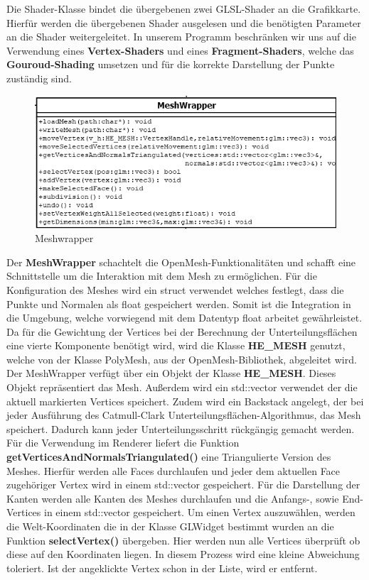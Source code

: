 \noindent Die Shader-Klasse bindet die übergebenen zwei GLSL-Shader an die Grafikkarte. Hierfür werden die übergebenen Shader ausgelesen und die benötigten Parameter an die Shader weitergeleitet. In unserem Programm beschränken wir uns auf die Verwendung eines \textbf{Vertex-Shaders} und eines \textbf{Fragment-Shaders}, welche das \textbf{Gouroud-Shading} umsetzen und für die korrekte Darstellung der Punkte zuständig sind.

	\begin{figure}[H]
	\centering
	\includegraphics[width=0.7\linewidth]{meshWrapper.png}
	\caption{Meshwrapper}
	\label{fig7}
	\end{figure}

\noindent Der \textbf{MeshWrapper} schachtelt die OpenMesh-Funktionalitäten und schafft eine Schnittstelle um die Interaktion mit dem Mesh zu ermöglichen. Für die Konfiguration des Meshes wird ein struct verwendet welches festlegt, dass die Punkte und Normalen als float gespeichert werden. Somit ist die Integration in die Umgebung, welche vorwiegend mit dem Datentyp float arbeitet gewährleistet. Da für die Gewichtung der Vertices bei der Berechnung der Unterteilungsflächen eine vierte Komponente benötigt wird, wird die Klasse \textbf{HE\_MESH} genutzt, welche von der Klasse PolyMesh, aus der OpenMesh-Bibliothek, abgeleitet wird.\newline
Der MeshWrapper verfügt über ein Objekt der Klasse \textbf{HE\_MESH}. Dieses Objekt repräsentiert das Mesh. Außerdem wird ein std::vector verwendet der die aktuell markierten Vertices speichert. Zudem wird ein Backstack angelegt, der bei jeder Ausführung des Catmull-Clark Unterteilungsflächen-Algorithmus, das Mesh speichert. Dadurch kann jeder Unterteilungsschritt rückgängig gemacht werden.\newline
Für die Verwendung im Renderer liefert die Funktion \textbf{getVerticesAndNormalsTriangulated()} eine Triangulierte Version des Meshes. Hierfür werden alle Faces durchlaufen und jeder dem aktuellen Face zugehöriger Vertex wird in einem std::vector gespeichert.\newline
Für die Darstellung der Kanten werden alle Kanten des Meshes durchlaufen und die Anfangs-, sowie End-Vertices in einem std::vector gespeichert.\newline
Um einen Vertex auszuwählen, werden die Welt-Koordinaten die in der Klasse GLWidget bestimmt wurden an die Funktion \textbf{selectVertex()} übergeben. Hier werden nun alle Vertices überprüft ob diese auf den Koordinaten liegen. In diesem Prozess wird eine kleine Abweichung toleriert. Ist der angeklickte Vertex schon in der Liste, wird er entfernt.
		
